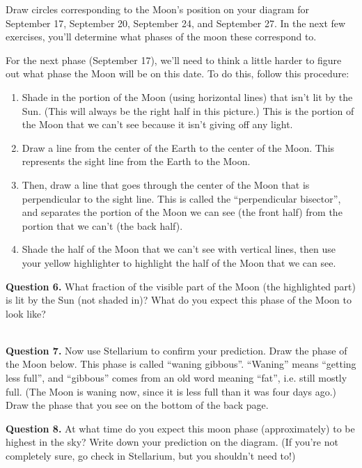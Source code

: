 \documentclass[11pt]{article}
\begin{document}
Draw circles corresponding to the Moon's position on your diagram for September 17, September 20, September 24, and September 27. In the next few exercises, you'll determine what phases of the moon these correspond to.

\newpage

For the next phase (September 17), we'll need to think a little harder to figure out what phase the Moon will be on this date. 
To do this, follow this procedure:

\begin{enumerate}
	\item Shade in the portion of the Moon (using horizontal lines) that isn't lit by the Sun. (This will always be the right half in this picture.) This is the portion of the Moon that we can't see because it isn't giving off any light.
	\item Draw a line from the center of the Earth to the center of the Moon. This represents the sight line from the Earth to the Moon.
	\item Then, draw a line that goes through the center of the Moon that is perpendicular to the sight line. This is called the ``perpendicular bisector'', and separates the portion of the Moon we can see (the front half) from the portion that we can't (the back half).
	\item Shade the half of the Moon that we can't see with vertical lines, then use your yellow highlighter to highlight the half of the Moon that we can see.
\end{enumerate}

\textbf{Question 6.} What fraction of the visible part of the Moon (the highlighted part) is lit by the Sun (not shaded in)? What do you expect this phase of the Moon to look like?


\vspace*{1.5cm}

\hrulefill\\

\textbf{Question 7.} Now use Stellarium to confirm your prediction. Draw the phase of the Moon below. This phase is called ``waning gibbous''. ``Waning'' means ``getting less full'', and ``gibbous'' comes from an old word meaning ``fat'', i.e. still mostly full. (The Moon is waning now, since it is less full than it was four days ago.)
Draw the phase that you see on the bottom of the back page.


\textbf{Question 8.} At what time do you expect this moon phase (approximately) to be highest in the sky? Write down your prediction on the diagram. (If you're not completely sure, go check in Stellarium, but you shouldn't need to!)
\end{document}
